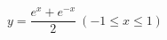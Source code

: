 \hspace*{2mm}\begin{minipage}[t]{\dimexpr\linewidth-2mm\relax}\vspace{0pt}
$y=\dfrac{e^x+e^{-x}}{2}\ (-1\le x\le 1)$\end{minipage}
